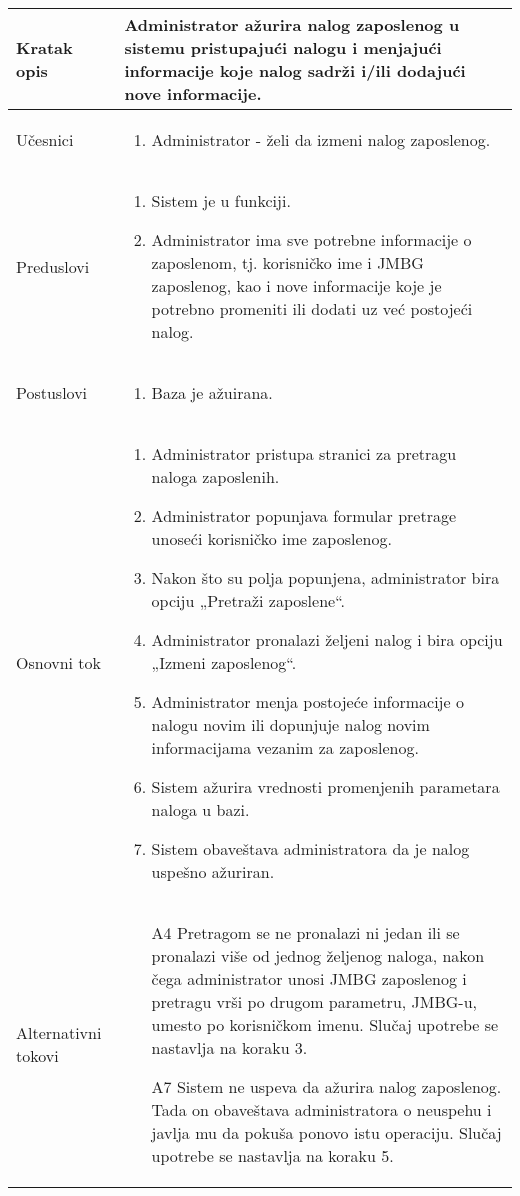 \documentclass[../main.tex]{subfiles}
\begin{document}
\begin{longtable}{| p{} | p{} |} 

\hline
    Kratak opis &  Administrator ažurira nalog zaposlenog u sistemu pristupajući nalogu i menjajući informacije koje nalog sadrži i/ili dodajući nove informacije.\\ 
\hline    
    Učesnici & 
    	\begin{enumerate}
        \item Administrator - želi da izmeni nalog zaposlenog.
     \end{enumerate}\\
\hline
   Preduslovi & \begin{enumerate}
       \item Sistem je u funkciji.
       \item Administrator ima sve potrebne informacije o zaposlenom, tj. korisničko ime i JMBG zaposlenog, kao i nove informacije koje je potrebno promeniti ili dodati uz već postojeći nalog.
   \end{enumerate}\\
\hline  
    Postuslovi & \begin{enumerate}
        \item Baza je ažuirana.
    \end{enumerate}\\
\hline
    Osnovni tok & \begin{enumerate}
        \item Administrator pristupa stranici za pretragu naloga zaposlenih.
        \item Administrator popunjava formular pretrage unoseći korisničko ime zaposlenog.
        \item Nakon što su polja popunjena, administrator bira opciju „Pretraži zaposlene“.
        \item Administrator pronalazi željeni nalog i bira opciju „Izmeni zaposlenog“.
        \item Administrator menja postojeće informacije o nalogu novim ili dopunjuje nalog novim informacijama vezanim za zaposlenog.
        \item Sistem ažurira vrednosti promenjenih parametara naloga u bazi.
        \item Sistem obaveštava administratora da je nalog uspešno ažuriran.
    \end{enumerate}\\
\hline
    Alternativni tokovi & \begin{itemize}
        \item[A4]  Pretragom se ne pronalazi ni jedan ili se pronalazi više od jednog željenog naloga, nakon čega administrator unosi JMBG zaposlenog i pretragu vrši po drugom parametru, JMBG-u, umesto po korisničkom imenu. Slučaj upotrebe se nastavlja na koraku 3.
        \item[A7]  Sistem ne uspeva da ažurira nalog zaposlenog. Tada on obaveštava administratora o neuspehu i javlja mu da pokuša ponovo istu operaciju. Slučaj upotrebe se nastavlja na koraku 5.


\end{itemize}
\end{longtable}
\end{document}
